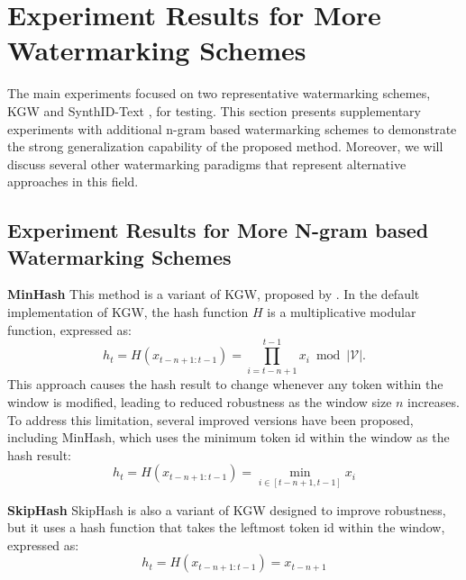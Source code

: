\section{Experiment Results for More Watermarking Schemes}
\label{sec:more_schemes}


The main experiments focused on two representative watermarking schemes, KGW \cite{DBLP:conf/icml/KirchenbauerGWK23} and SynthID-Text \cite{Dathathri2024}, for testing. This section presents supplementary experiments with additional n-gram based watermarking schemes to demonstrate the strong generalization capability of the proposed method. Moreover, we will discuss several other watermarking paradigms that represent alternative approaches in this field. 

\subsection{Experiment Results for More N-gram based Watermarking Schemes}
\label{sec:more_n_gram}
\vspace{3pt}

\noindent\textbf{MinHash} \quad This method is a variant of KGW, proposed by \citet{kirchenbauer2023reliability}. In the default implementation of KGW, the hash function $H$ is a multiplicative modular function, expressed as:
\begin{equation}
h_t = H(x_{t-n+1:t-1}) = \prod_{i=t-n+1}^{t-1} x_i \bmod |\mathcal{V}|.
\end{equation}
This approach causes the hash result to change whenever any token within the window is modified, leading to reduced robustness as the window size $n$ increases. To address this limitation, several improved versions have been proposed, including MinHash, which uses the minimum token id within the window as the hash result:
\begin{equation}
h_t = H(x_{t-n+1:t-1}) = \min_{i \in [t-n+1,t-1]} x_i
\end{equation}

\vspace{3pt}

\noindent\textbf{SkipHash} \quad SkipHash \cite{kirchenbauer2023reliability} is also a variant of KGW designed to improve robustness, but it uses a hash function that takes the leftmost token id within the window, expressed as:
\begin{equation}
h_t = H(x_{t-n+1:t-1}) = x_{t-n+1}
\end{equation}

